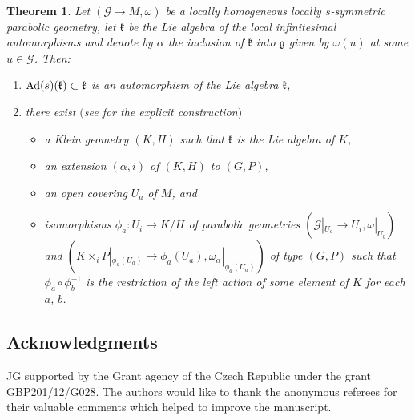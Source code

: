 \documentclass[pdftex]{sigma}
\newcommand{\om}{\omega}
\newcommand{\ba}{\mathcal{G}}
\newcommand{\fg}{\mathfrak g}
\newcommand{\fk}{\mathfrak k}
\newcommand{\Ad}{{\rm Ad}}
\numberwithin{equation}{section}
\newtheorem{Theorem}{Theorem}[section]
\begin{document}
\begin{Theorem} \label{5.1}
Let $(\ba\to M,\om)$ be a locally homogeneous locally $s$-symmetric parabolic geo\-metry, let $\fk$ be the Lie algebra of the local infinitesimal automorphisms and denote by $\alpha$ the inclusion of $\fk$ into $\fg$ given by $\om(u)$ at some $u\in \ba$. Then:
\begin{enumerate}\itemsep=0pt
\item[$1)$] $\Ad(s)(\fk)\subset \fk$ is an automorphism of the Lie algebra $\fk$,
\item[$2)$] there exist $($see {\rm \cite[Section 3]{GZ3}} for the explicit construction$)$
\begin{itemize}\itemsep=0pt
\item a Klein geometry $(K,H)$ such that $\fk$ is the Lie algebra of $K$,
\item an extension $(\alpha,i)$ of $(K,H)$ to $(G,P)$,
\item an open covering $U_a$ of $M$, and
\item isomorphisms $\phi_a\colon U_i\to K/H$ of parabolic geometries $(\ba|_{U_a}\to U_i,\om|_{U_b})$ and $(K\times_{i}P|_{\phi_a(U_a)}\to \phi_a(U_a), \om_\alpha|_{\phi_a(U_a)})$ of type $(G,P)$ such that $\phi_a\circ \phi_b^{-1}$ is the restriction of the left action of some element of $K$ for each $a$, $b$.
\end{itemize}
\end{enumerate}
\end{Theorem}

\subsection*{Acknowledgments}

JG supported by the Grant agency of the Czech Republic under the grant GBP201/12/G028.
The authors would like to thank the anonymous referees for their valuable comments which helped to improve the manuscript.
\end{document}
